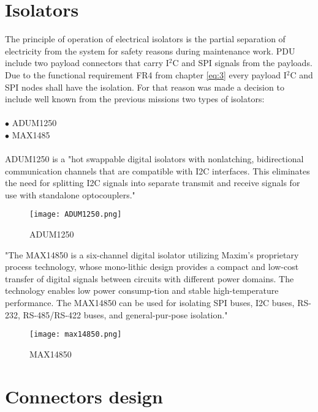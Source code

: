  \section{Isolators}
 
The principle of operation of electrical isolators is the partial separation of electricity from the system for safety reasons during maintenance work. PDU include two payload connectors that carry I$^2$C and SPI signals from the payloads. Due to the functional requirement FR4 from chapter \ref{eq:3} every payload I$^2$C and SPI nodes shall have the isolation. For that reason was made a decision to include well known from the previous missions two types of isolators:\\ \\

$\bullet$ ADUM1250\\
$\bullet$ MAX1485\\ \\

ADUM1250 \cite{30} is a "hot swappable digital isolators with nonlatching, bidirectional communication channels that are compatible with I2C interfaces. This eliminates the need for splitting I2C signals into separate transmit and receive signals for use with standalone optocouplers."

 \begin{figure}[h]
 	\centering
 	\texttt{[image: ADUM1250.png]}
 	\caption{ADUM1250}
 	\label{fig: adum}
 \end{figure} 

\cite{31} "The  MAX14850  is  a  six-channel  digital  isolator  utilizing  Maxim’s  proprietary  process  technology,  whose  mono-lithic  design  provides  a  compact  and  low-cost  transfer  of  digital  signals  between  circuits  with  different  power  domains.  The  technology  enables  low  power  consump-tion and stable high-temperature performance. The MAX14850 can be used for isolating SPI buses, I2C buses, RS-232, RS-485/RS-422 buses, and general-pur-pose isolation."

\begin{figure}[h]
	\centering
	\texttt{[image: max14850.png]}
	\caption{MAX14850}
	\label{fig: adum}
\end{figure} 

\section{Connectors design}

